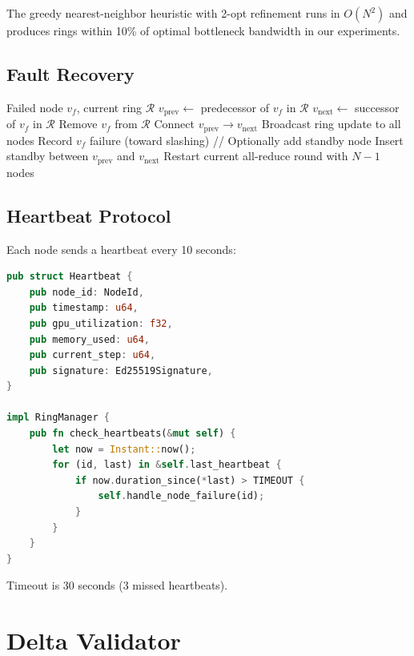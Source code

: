 \documentclass[11pt,letterpaper]{article}
\begin{document}
The greedy nearest-neighbor heuristic with 2-opt refinement runs in $O(N^2)$ and produces rings within 10\% of optimal bottleneck bandwidth in our experiments.

\subsection{Fault Recovery}

\begin{algorithm}[t]
\caption{Ring Fault Recovery}
\label{alg:fault}
\begin{algorithmic}[1]
\REQUIRE Failed node $v_f$, current ring $\mathcal{R}$
\STATE $v_{\text{prev}} \leftarrow$ predecessor of $v_f$ in $\mathcal{R}$
\STATE $v_{\text{next}} \leftarrow$ successor of $v_f$ in $\mathcal{R}$
\STATE Remove $v_f$ from $\mathcal{R}$
\STATE Connect $v_{\text{prev}} \to v_{\text{next}}$
\STATE Broadcast ring update to all nodes
\STATE Record $v_f$ failure (toward slashing)
\STATE // Optionally add standby node
    \STATE Insert standby between $v_{\text{prev}}$ and $v_{\text{next}}$
\ENDIF
\STATE Restart current all-reduce round with $N-1$ nodes
\end{algorithmic}
\end{algorithm}

\subsection{Heartbeat Protocol}

Each node sends a heartbeat every 10 seconds:

\begin{lstlisting}[language=Rust,caption=Heartbeat message]
pub struct Heartbeat {
    pub node_id: NodeId,
    pub timestamp: u64,
    pub gpu_utilization: f32,
    pub memory_used: u64,
    pub current_step: u64,
    pub signature: Ed25519Signature,
}

impl RingManager {
    pub fn check_heartbeats(&mut self) {
        let now = Instant::now();
        for (id, last) in &self.last_heartbeat {
            if now.duration_since(*last) > TIMEOUT {
                self.handle_node_failure(id);
            }
        }
    }
}
\end{lstlisting}

Timeout is 30 seconds (3 missed heartbeats).

\section{Delta Validator}
\label{sec:validator}
\end{document}
